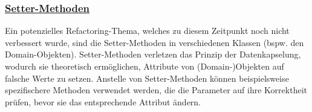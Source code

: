 \subsubsection{\href{https://refactoring.guru/remove-setting-method}{Setter-Methoden}}
Ein potenzielles Refactoring-Thema, welches zu diesem Zeitpunkt noch nicht verbessert wurde, sind die Setter-Methoden in verschiedenen Klassen (bspw. den Domain-Objekten). Setter-Methoden verletzen das Prinzip der Datenkapselung, wodurch sie theoretisch ermöglichen, Attribute von (Domain-)Objekten auf falsche Werte zu setzen. Anstelle von Setter-Methoden können beispielsweise spezifischere Methoden verwendet werden, die die Parameter auf ihre Korrektheit prüfen, bevor sie das entsprechende Attribut ändern.




